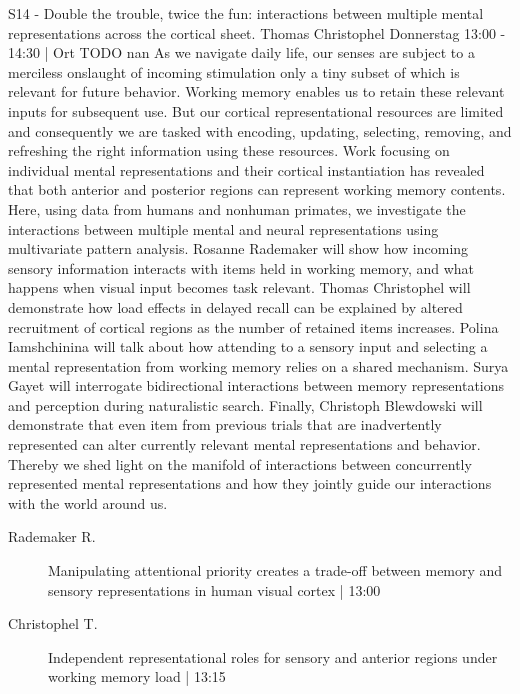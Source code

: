
            \begin{symposium}
            {S14 - Double the trouble, twice the fun: interactions between multiple mental representations across the cortical sheet.}
            {Thomas Christophel}
            {Donnerstag 13:00 - 14:30 | Ort TODO}
            {nan}
            As we navigate daily life, our senses are subject to a merciless onslaught of incoming stimulation only a tiny subset of which is relevant for future behavior. Working memory enables us to retain these relevant inputs for subsequent use. But our cortical representational resources are limited and consequently we are tasked with encoding, updating, selecting, removing, and refreshing the right information using these resources. Work focusing on individual mental representations and their cortical instantiation has revealed that both anterior and posterior regions can represent working memory contents. Here, using data from humans and nonhuman primates, we investigate the interactions between multiple mental and neural representations using multivariate pattern analysis. Rosanne Rademaker will show how incoming sensory information interacts with items held in working memory, and what happens when visual input becomes task relevant. Thomas Christophel will demonstrate how load effects in delayed recall can be explained by altered recruitment of cortical regions as the number of retained items increases. Polina Iamshchinina will talk about how attending to a sensory input and selecting a mental representation from working memory relies on a shared mechanism. Surya Gayet will interrogate bidirectional interactions between memory representations and perception during naturalistic search. Finally, Christoph Blewdowski will demonstrate that even item from previous trials that are inadvertently represented can alter currently relevant mental representations and behavior. Thereby we shed light on the manifold of interactions between concurrently represented mental representations and how they jointly guide our interactions with the world around us.
            \begin{description}    
            
                \item [ Rademaker R.] Manipulating attentional priority creates a trade-off between memory and sensory representations in human visual cortex  \textcolor{mygray}{ | 13:00}    
                
                \item [ Christophel T.] Independent representational roles for sensory and anterior regions under working memory load  \textcolor{mygray}{ | 13:15}    
                

\end{description}
\end{symposium}
